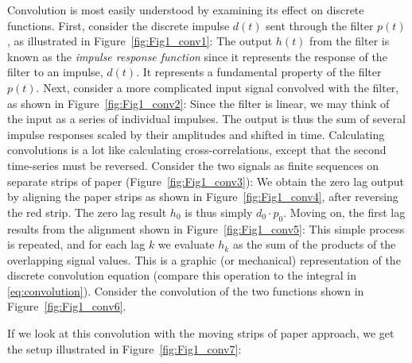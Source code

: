 	Convolution is most easily understood by examining its effect on discrete functions.  
First, consider the discrete impulse $d(t)$ sent through the filter $p(t)$, as illustrated in Figure~\ref{fig:Fig1_conv1}:
\noindent
The output $h(t)$ from the filter is 
known as the \emph{impulse response function} since it represents the response of the filter to an 
impulse, $d(t)$.  It represents a fundamental property of the filter $p(t)$.
Next, consider a more complicated input signal convolved with the filter, as shown in Figure~\ref{fig:Fig1_conv2}:
\noindent
Since the filter is linear, we may think of the input as a series of individual impulses. The output 
is thus the sum of several impulse responses scaled by their amplitudes and shifted in 
time.  Calculating convolutions is a lot like calculating cross-correlations, except 
that the second time-series must be reversed.  Consider the two signals as finite sequences on separate strips of 
paper (Figure~\ref{fig:Fig1_conv3}):
\noindent
We obtain the zero lag output by aligning the paper strips as shown in Figure~\ref{fig:Fig1_conv4},
after reversing the red strip.
\noindent
The zero lag result $h_0$ is thus simply $d_0 \cdot p_0$.  Moving on, the first lag results from the alignment shown in  Figure~\ref{fig:Fig1_conv5}:
\noindent
This simple process is repeated, and for each lag $k$ we evaluate $h_k$ as the sum of the products of the overlapping 
signal values.  This is a graphic (or mechanical) representation of the discrete convolution 
equation (compare this operation to the integral in \ref{eq:convolution}).
Consider the convolution of the two functions shown in Figure~\ref{fig:Fig1_conv6}.
 
\noindent
If we look at this convolution with the moving strips of paper approach, we get the setup illustrated in Figure~\ref{fig:Fig1_conv7}:
 

